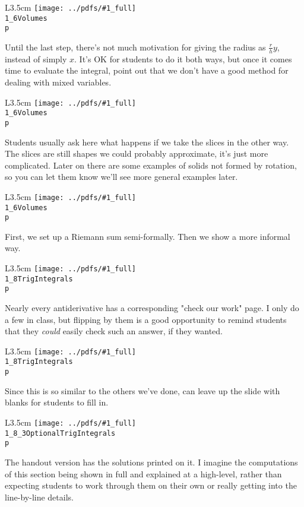 \documentclass{beamer}
\newcommand{\notefig}[3]{%
	\begin{wrapfigure}{L}{3.5cm}
	\texttt{[image: ../pdfs/\#1\_full]}\\
	\footnotesize
	\texttt{#2}\\
	 \texttt{p \pageref{#3}}
	\end{wrapfigure}
	}
\begin{document}
%
\begin{frame}
\notefig{1_6Volumes}{1\_6Volumes}{note1.6a}
Until the last step, there's not much motivation for giving the radius as $\frac{r}{h}y$, instead of simply $x$. It's OK for students to do it both ways, but once it comes time to evaluate the integral, point out that we don't have a good method for dealing with mixed variables.

\end{frame}

%
\begin{frame}
\notefig{1_6Volumes}{1\_6Volumes}{note1.6b}
Students usually ask here what happens if we take the slices in the other way. The slices are still shapes we could probably approximate, it's just more complicated. Later on there are some examples of solids not formed by rotation, so you can let them know we'll see more general examples later.

\end{frame}
%
\begin{frame}
\notefig{1_6Volumes}{1\_6Volumes}{note1.6c}
First, we set up a Riemann sum semi-formally. Then we show a more informal way.
\end{frame}
%
\begin{frame}
\notefig{1_8TrigIntegrals}{1\_8TrigIntegrals}{note1.8a}
Nearly every antiderivative has a corresponding "check our work" page. I only do a few in class, but flipping by them is a good opportunity to remind students that they \textit{could} easily check such an answer, if they wanted.

\end{frame}
%
\begin{frame}
\notefig{1_8TrigIntegrals}{1\_8TrigIntegrals}{note1.8b}
Since this is so similar to the others we've done, can leave up the slide with blanks for students to fill in.
\end{frame}

\begin{frame}
\notefig{1_8_3OptionalTrigIntegrals}{1\_8\_3Optional\linebreak TrigIntegrals}{note1.8.3a}
The handout version has the solutions printed on it. I imagine the computations of this section being shown in full and explained at a high-level, rather than expecting students to work through them on their own or really getting into the line-by-line details.
\end{frame}
\end{document}
